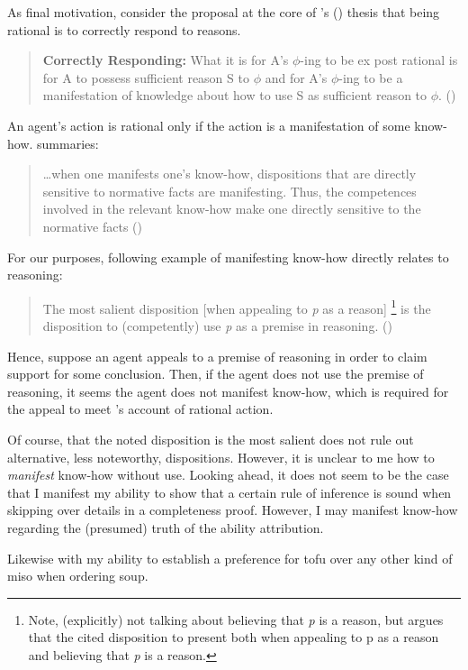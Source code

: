 \begin{note}
  As final motivation, consider the proposal at the core of \citeauthor{Lord:2018aa}'s (\Citeyear{Lord:2018aa}) thesis that being rational is to correctly respond to reasons.

  \begin{quote}
    \textbf{Correctly Responding:} What it is for A's \(\phi\)-ing to be ex post rational is for A to possess sufficient reason S to \(\phi\) and for A's \(\phi\)-ing to be a manifestation of knowledge about how to use S as sufficient reason to \(\phi\).\nolinebreak
    \mbox{}\hfill\mbox{(\Citeyear[143]{Lord:2018aa})}
  \end{quote}

  An agent's action is rational only if the action is a manifestation of some know-how.
  \citeauthor{Lord:2018aa} summaries:

  \begin{quote}
    \dots when one manifests one's know-how, dispositions that are directly sensitive to normative facts are manifesting. Thus, the competences involved in the relevant know-how make one directly sensitive to the normative facts\nolinebreak
    \mbox{}\hfill\mbox{(\Citeyear[16]{Lord:2018aa})}
  \end{quote}

  For our purposes, following example of manifesting know-how directly relates to reasoning:

  \begin{quote}
    The most salient disposition [when appealing to \emph{p} as a reason]\nolinebreak
    \footnote{Note, \citeauthor{Lord:2018aa} (explicitly) not talking about believing that \emph{p} is a reason, but argues that the cited disposition to present both when appealing to p as a reason and believing that \emph{p} is a reason.}
    is the disposition to (competently) use \emph{p} as a premise in reasoning.\nolinebreak
    \mbox{}\hfill\mbox{(\Citeyear[25]{Lord:2018aa})}
  \end{quote}

  Hence, suppose an agent appeals to a premise of reasoning in order to claim support for some conclusion.
  Then, if the agent does not use the premise of reasoning, it seems the agent does not manifest know-how, which is required for the appeal to meet \citeauthor{Lord:2018aa}'s account of rational action.

  Of course, that the noted disposition is the most salient does not rule out alternative, less noteworthy, dispositions.
  However, it is unclear to me how to \emph{manifest} know-how without use.
  Looking ahead, it does not seem to be the case that I manifest my ability to show that a certain rule of inference is sound when skipping over details in a completeness proof.
  However, I may manifest know-how regarding the (presumed) truth of the ability attribution.

  Likewise with my ability to establish a preference for tofu over any other kind of miso when ordering soup.
\end{note}


